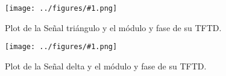 \documentclass[letterpaper, 10 pt, conference]{ieeeconf}  %
\newcommand{\image}[2] {
  \begin{figure}[H]
    \centering
    \texttt{[image: ../figures/\#1.png]}
    \caption{#2}
    \label{fig:#1}
  \end{figure}
}
\begin{document}
\image{triangulo_tftd}{Plot de la Se\~{n}al tri\'angulo y el m\'odulo y fase de su TFTD.}
\image{delta_tftd}{Plot de la Se\~{n}al delta y el m\'odulo y fase de su TFTD.}


%
%
\end{document}
